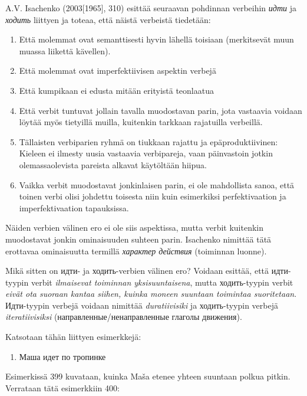 \documentclass[]{scrreprt}
\providecommand{\tightlist}{%
  \setlength{\itemsep}{0pt}\setlength{\parskip}{0pt}}
\begin{document}
A.V. Isachenko (2003{[}1965{]}, 310) esittää seuraavan pohdinnan
verbeihin \emph{идти} ja \emph{ходить} liittyen ja toteaa, että näistä
verbeistä tiedetään:

\begin{enumerate}
\def\labelenumi{\arabic{enumi}.}
\tightlist
\item
  Että molemmat ovat semanttisesti hyvin lähellä toisiaan (merkitsevät
  muun muassa liikettä kävellen).
\item
  Että molemmat ovat imperfektiivisen aspektin verbejä
\item
  Että kumpikaan ei edusta mitään erityistä teonlaatua
\item
  Että verbit tuntuvat jollain tavalla muodostavan parin, jota vastaavia
  voidaan löytää myös tietyillä muilla, kuitenkin tarkkaan rajatuilla
  verbeillä.
\item
  Tällaisten verbiparien ryhmä on tiukkaan rajattu ja epäproduktiivinen:
  Kieleen ei ilmesty uusia vastaavia verbipareja, vaan päinvastoin
  jotkin olemassaolevista pareista alkavat käytöltään hiipua.
\item
  Vaikka verbit muodostavat jonkinlaisen parin, ei ole mahdollista
  sanoa, että toinen verbi olisi johdettu toisesta niin kuin esimerkiksi
  perfektivaation ja imperfektivaation tapauksissa.
\end{enumerate}

Näiden verbien välinen ero ei ole siis aspektissa, mutta verbit
kuitenkin muodostavat jonkin ominaisuuden suhteen parin. Isachenko
nimittää tätä erottavaa ominaisuutta termillä \emph{характер действия}
(toiminnan luonne).

Mikä sitten on идти- ja ходить-verbien välinen ero? Voidaan esittää,
että идти-tyypin verbit \emph{ilmaisevat toiminnan yksisuuntaisena},
mutta ходить-tyypin verbit \emph{eivät ota suoraan kantaa siihen, kuinka
moneen suuntaan toimintaa suoritetaan}. Идти-tyypin verbejä voidaan
nimittää \emph{duratiivisiki} ja ходить-tyypin verbejä
\emph{iteratiivisiksi} (направленные/ненаправленные глаголы движения).

Katsotaan tähän liittyen esimerkkejä:

\begin{enumerate}
\def\labelenumi{(\arabic{enumi})}
\setcounter{enumi}{398}
\tightlist
\item
  Маша идет по тропинке
\end{enumerate}

Esimerkissä 399 kuvataan, kuinka Maša etenee yhteen suuntaan polkua
pitkin. Verrataan tätä esimerkkiin 400:
\end{document}
